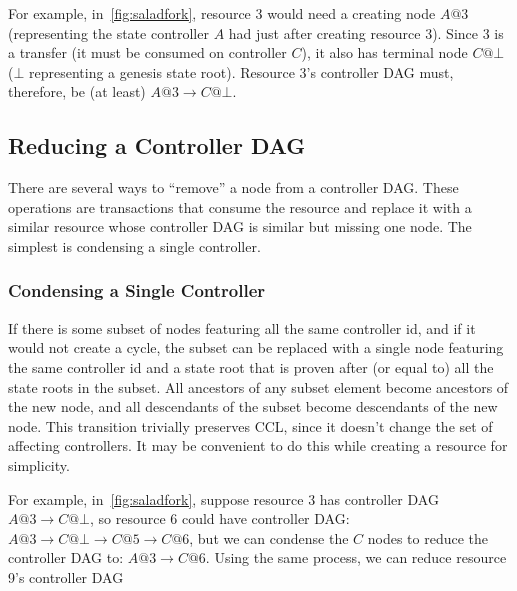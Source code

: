 \documentclass[a4paper,USenglish,cleveref, autoref, thm-restate, anonymous]{lipics-v2021}
\begin{document}
For example, in~\cref{fig:saladfork}, resource 3 would need a creating node $A@3$ (representing the state controller $A$ had just after creating resource $3$).
Since $3$ is a transfer (it must be consumed on controller $C$), it also has terminal node $C@\bot$ ($\bot$ representing a genesis state root). 
Resource 3's controller DAG must, therefore, be (at least) $A@3 \rightarrow C@\bot$.

\subsection{Reducing a Controller DAG}
There are several ways to ``remove'' a node from a controller DAG.
These operations are transactions that consume the resource and replace it with a similar resource whose controller DAG is similar but missing one node. 
The simplest is condensing a single controller.

\subsubsection{Condensing a Single Controller}
If there is some subset of nodes featuring all the same controller id, and if it would not create a cycle, the subset can be replaced with a single node featuring the same controller id and a state root that is proven after (or equal to) all the state roots in the subset. 
All ancestors of any subset element become ancestors of the new node, and all descendants of the subset become descendants of the new node. 
This transition trivially preserves CCL, since it doesn't change the set of affecting controllers. 
It may be convenient to do this while creating a resource for simplicity.

For example, in~\cref{fig:saladfork}, suppose resource 3 has controller DAG $A@3 \rightarrow C@\bot$, so resource 6 could have controller DAG: $A@3 \rightarrow C@\bot\rightarrow C@5\rightarrow C@6$, but we can condense the $C$ nodes to reduce the controller DAG to: $A@3 \rightarrow C@6$.
Using the same process, we can reduce resource 9's controller DAG
\end{document}
